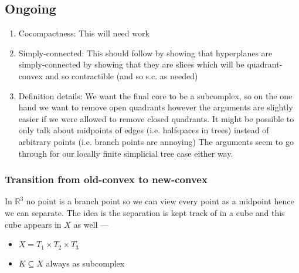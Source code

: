 \documentclass{article}
\theoremstyle{mystyle}
\theoremstyle{remark}
\begin{document}
\subsection{Ongoing}
\begin{enumerate}
    \item Cocompactness: This will need work
    \item Simply-connected: This should follow by showing that hyperplanes are simply-connected by showing that they are slices which will be quadrant-convex and so contractible (and so s.c. as needed)
    \item Definition details: We want the final core to be a subcomplex, so on the one hand we want to remove open quadrants however the arguments are slightly easier if we were allowed to remove closed quadrants. It might be possible to only talk about midpoints of edges (i.e. halfspaces in trees) instead of arbitrary points (i.e. branch points are annoying) The arguments seem to go through for our locally finite simplicial tree case either way. 
\end{enumerate}

\subsubsection{Transition from old-convex to new-convex}

In \(\mathbb{R}^{3} \) no point is a branch point so we can view every point as a midpoint hence we can separate. The idea is the separation is kept track of in a cube and this cube appears in \(X\) as well --- 

\begin{itemize}
	\item \(X=T_{1} \times T_{2} \times T_{3}\)
	\item \(K \subseteq X\) always as subcomplex
\end{itemize}
\end{document}
